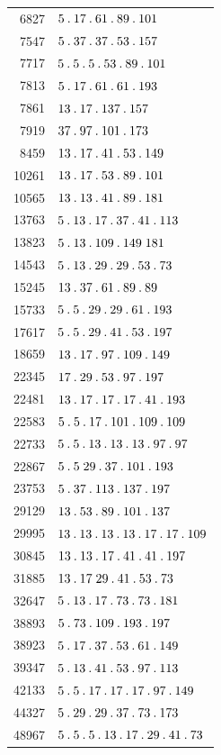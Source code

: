 \begin{longtable}{@{}r|l@{}}
6827 & $5\pdot 17\pdot 61\pdot 89\pdot 101$\\
7547 & $5\pdot 37\pdot 37\pdot 53\pdot 157$\\
7717 & $5\pdot 5\pdot 5\pdot 53\pdot 89\pdot 101$\\
7813 & $5\pdot 17\pdot 61\pdot 61\pdot 193$\\
7861 & $13\pdot 17\pdot 137\pdot 157$\\
7919 & $37\pdot 97\pdot 101\pdot 173$\\
8459 & $13\pdot 17\pdot 41\pdot 53\pdot 149$\\
10261 & $13\pdot 17\pdot 53\pdot 89\pdot 101$\\
10565 & $13\pdot 13\pdot 41\pdot 89\pdot 181$\\
13763 & $5\pdot 13\pdot 17\pdot 37\pdot 41\pdot 113$\\
13823 & $5\pdot 13\pdot 109\pdot 149\;181$\\
14543 & $5\pdot 13\pdot 29\pdot 29\pdot 53\pdot 73$\\
15245 & $13\pdot 37\pdot 61\pdot 89\pdot 89$\\
15733 & $5\pdot 5\pdot 29\pdot 29\pdot 61\pdot 193$\\
17617 & $5\pdot 5\pdot 29\pdot 41\pdot 53\pdot 197$\\
18659 & $13\pdot 17\pdot 97\pdot 109\pdot 149$\\
22345 & $17\pdot 29\pdot 53\pdot 97\pdot 197$\\
22481 & $13\pdot 17\pdot 17\pdot 17\pdot 41\pdot 193$\\
22583 & $5\pdot 5\pdot 17\pdot 101\pdot 109\pdot 109$\\
22733 & $5\pdot 5\pdot 13\pdot 13\pdot 13\pdot 97\pdot 97$\\
22867 & $5\pdot 5\;29\pdot 37\pdot 101\pdot 193$\\
23753 & $5\pdot 37\pdot 113\pdot 137\pdot 197$\\
29129 & $13\pdot 53\pdot 89\pdot 101\pdot 137$\\
29995 & $13\pdot 13\pdot 13\pdot 13\pdot 17\pdot 17\pdot 109$\\
30845 & $13\pdot 13\pdot 17\pdot 41\pdot 41\pdot 197$\\
31885 & $13\pdot 17\;29\pdot 41\pdot 53\pdot 73$\\
32647 & $5\pdot 13\pdot 17\pdot 73\pdot 73\pdot 181$\\
38893 & $5\pdot 73\pdot 109\pdot 193\pdot 197$\\
38923 & $5\pdot 17\pdot 37\pdot 53\pdot 61\pdot 149$\\
39347 & $5\pdot 13\pdot 41\pdot 53\pdot 97\pdot 113$\\
42133 & $5\pdot 5\pdot 17\pdot 17\pdot 17\pdot 97\pdot 149$\\
44327 & $5\pdot 29\pdot 29\pdot 37\pdot 73\pdot 173$\\
48967 & $5\pdot 5\pdot 5\pdot 13\pdot 17\pdot 29\pdot 41\pdot 73$\\
\end{longtable}\endgroup
